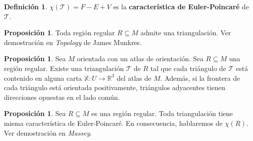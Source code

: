\documentclass[twoside]{report}
\theoremstyle{definition}
\newtheorem{defi}[theorem]{Definición}
\newtheorem{prop}[theorem]{Proposición}
\numberwithin{equation}{section}
\newcommand{\R}{\mathbb{R}}
\newcommand{\X}{\mathbb{X}}
\begin{document}
\begin{defi}
$χ(\mathcal{T}) = F -E + V $ es la \textbf{característica de Euler-Poincaré} de $\mathcal{T}$.
\end{defi}

\begin{prop}
Toda región regular $R \subseteq M$ admite una triangulación. Ver demostración en \textit{Topology} de James Munkres.
\end{prop}

\begin{prop} Sea $M$ orientada con un atlas de orientación. Sea $R \subseteq M$ una región regular. Existe una triangulación $\mathcal{T}$ de $R$ tal que cada triángulo de $\mathcal{T}$ está contenido en alguna carta $\X : U \to \R^3$ del atlas de $M$. Además, si la frontera de cada triángulo está orientada positivamente, triángulos adyacentes tienen direcciones opuestas en el lado común.
\end{prop}

\begin{prop} Sea $R \subseteq M$ es una región regular. Toda triangulación tiene misma característica de Euler-Poincaré. En consecuencia, hablaremos de $χ(R)$. Ver demostración en \textit{Massey}.
\end{prop}
\end{document}
